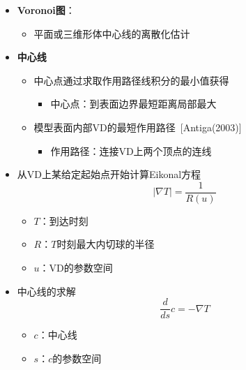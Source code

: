 \begin{frame}
\begin{itemize}
\item \textbf{Voronoi图}：
\begin{itemize}
\item 平面或三维形体中心线的离散化估计
\end{itemize}
\item \textbf{中心线}
\begin{itemize}
\item 中心点通过求取作用路径线积分的最小值获得
\begin{itemize}
\item \alert{中心点}：到表面边界最短距离局部最大
\end{itemize}
\item 模型表面内部VD的最短作用路径~[Antiga(2003)]
\begin{itemize}
\item \alert{作用路径}：连接VD上两个顶点的连线
\end{itemize}
\end{itemize}
\end{itemize}
\end{frame}

\begin{frame}
\begin{itemize}
\item 从VD上某给定起始点开始计算Eikonal方程
\begin{equation*}
\left| \nabla T \right| = \frac{1}{R(u)}
\end{equation*}
\begin{itemize}
\item $T$：到达时刻
\item $R$：$T$时刻最大内切球的半径
\item $u$：VD的参数空间
\end{itemize}
\item 中心线的求解
\begin{equation*}
\frac{d}{ds} c = - \nabla T
\end{equation*}
\begin{itemize}
\item $c$：中心线
\item $s$：$c$的参数空间
\end{itemize}
\end{itemize}
\end{frame}


